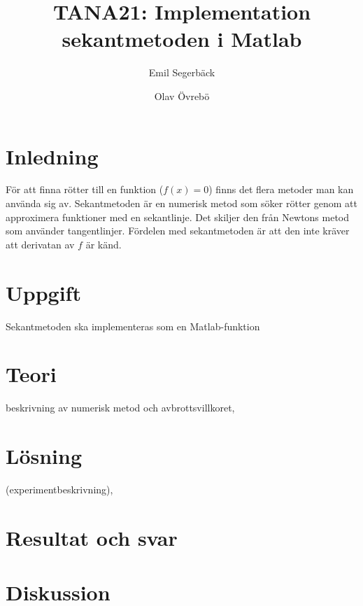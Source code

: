 \documentclass{report}
\title{TANA21: Implementation sekantmetoden i Matlab}
\author{Emil Segerbäck \and Olav Övrebö}
\begin{document}
\maketitle

\section{Inledning}
För att finna rötter till en funktion ($f(x) = 0$) finns det flera metoder man kan använda sig av. Sekantmetoden är en numerisk metod som söker rötter genom att approximera funktioner med en sekantlinje. Det skiljer den från Newtons metod som använder tangentlinjer. Fördelen med sekantmetoden är att den inte kräver att derivatan av $f$ är känd.

\section{Uppgift}
Sekantmetoden ska implementeras som en Matlab-funktion 

\section{Teori}
beskrivning av numerisk metod och avbrottsvillkoret,

\section{Lösning}
(experimentbeskrivning),

\section{Resultat och svar}

\section{Diskussion}
\end{document}

